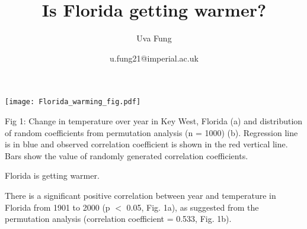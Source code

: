 \documentclass[12pt]{article}
\title{Is Florida getting warmer?}
\author{Uva Fung}
\date{u.fung21@imperial.ac.uk}
\begin{document}
  \maketitle


  \texttt{[image: Florida\_warming\_fig.pdf]}


{\footnotesize Fig 1: Change in temperature over year in Key West, Florida (a) and distribution of random coefficients from permutation analysis (n = 1000) (b). Regression line is in blue and observed correlation coefficient is shown in the red vertical line. Bars show the value of randomly generated correlation coefficients. }


\vspace{\baselineskip}

  Florida is getting warmer.

  There is a significant positive correlation between year and temperature in Florida from 1901 to 2000 (p $<$ 0.05, Fig. 1a), as suggested from the permutation analysis (correlation coefficient = 0.533, Fig. 1b).
\end{document}
